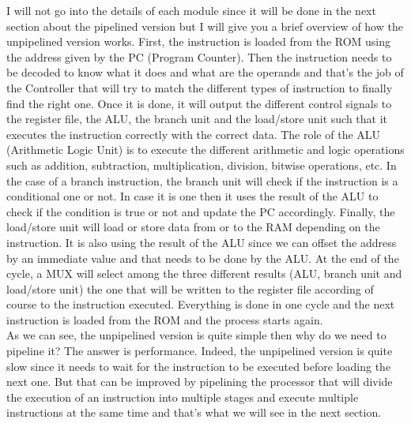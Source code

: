 I will not go into the details of each module since it will be done in the next section about the pipelined version but I will give you a
brief overview of how the unpipelined version works.
First, the instruction is loaded from the ROM using the address given by the PC (Program Counter). Then the instruction needs to be decoded to know 
what it does and what are the operands and that's the job of the Controller that will try to match the different types of instruction to finally 
find the right one. Once it is done, it will output the different control signals to the register file, the ALU, the branch unit and the load/store unit such 
that it executes the instruction correctly with the correct data. The role of the ALU (Arithmetic Logic Unit) is to execute the different arithmetic
and logic operations such as addition, subtraction, multiplication, division, bitwise operations, etc. In the case of a branch instruction, the branch unit
will check if the instruction is a conditional one or not. In case it is one then it uses the result of the ALU to check if the condition is true or not
and update the PC accordingly. Finally, the load/store unit will load or store data from or to the RAM depending on the instruction. It is also using the 
result of the ALU since we can offset the address by an immediate value and that needs to be done by the ALU\@.
At the end of the cycle, a MUX will select among the three different results (ALU, branch unit and load/store unit) the one that will be written to the register file
according of course to the instruction executed.
Everything is done in one cycle and the next instruction is loaded from the ROM and the process starts again. \\

As we can see, the unpipelined version is quite simple then why do we need to pipeline it? The answer is performance. Indeed, the unpipelined version
is quite slow since it needs to wait for the instruction to be executed before loading the next one. But that can be improved by pipelining the processor
that will divide the execution of an instruction into multiple stages and execute multiple instructions at the same time and that's what we will see in the next section.



